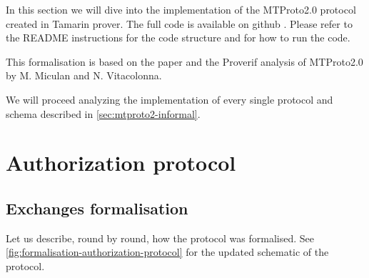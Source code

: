 In this section we will dive into the implementation of the MTProto2.0 protocol created in Tamarin prover. The full code is available on github \cite{MTProto2-Tamarin}. Please refer to the README instructions for the code structure and for how to run the code.

This formalisation is based on the paper \cite{MTProto2-Proverif} and the Proverif analysis \cite{MTProto2-Proverif-impl} of MTProto2.0 by M. Miculan and N. Vitacolonna.

We will proceed analyzing the implementation of every single protocol and schema described in \cref{sec:mtproto2-informal}.

\section{Authorization protocol}
\label{sec:auth-prot-formalisation}
\subsection{Exchanges formalisation}
Let us describe, round by round, how the protocol was formalised. See \cref{fig:formalisation-authorization-protocol} for the updated schematic of the protocol.


